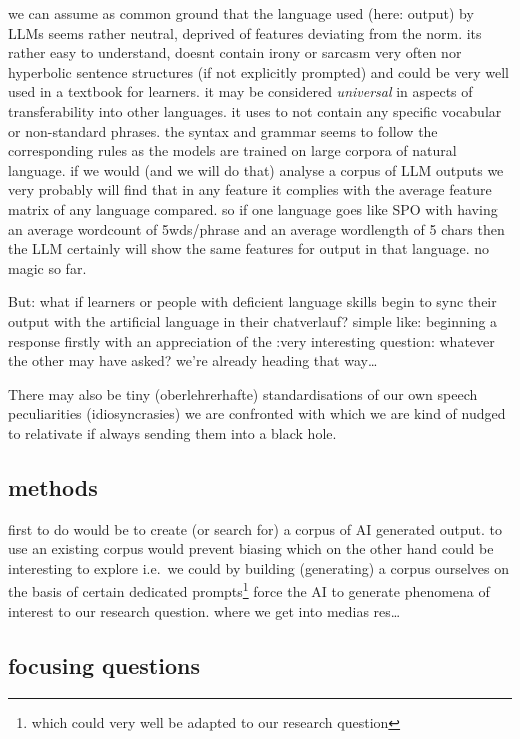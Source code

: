 \documentclass[
  letterpaper,
  DIV=11,
  numbers=noendperiod]{scrartcl}
\begin{document}
we can assume as common ground that the language used (here: output) by
LLMs seems rather neutral, deprived of features deviating from the norm.
its rather easy to understand, doesnt contain irony or sarcasm very
often nor hyperbolic sentence structures (if not explicitly prompted)
and could be very well used in a textbook for learners. it may be
considered \emph{universal} in aspects of transferability into other
languages. it uses to not contain any specific vocabular or non-standard
phrases. the syntax and grammar seems to follow the corresponding rules
as the models are trained on large corpora of natural language. if we
would (and we will do that) analyse a corpus of LLM outputs we very
probably will find that in any feature it complies with the average
feature matrix of any language compared. so if one language goes like
SPO with having an average wordcount of 5wds/phrase and an average
wordlength of 5 chars then the LLM certainly will show the same features
for output in that language. no magic so far.

But: what if learners or people with deficient language skills begin to
sync their output with the artificial language in their chatverlauf?
simple like: beginning a response firstly with an appreciation of the
:very interesting question: whatever the other may have asked? we're
already heading that way\ldots{}

There may also be tiny (oberlehrerhafte) standardisations of our own
speech peculiarities (idiosyncrasies) we are confronted with which we
are kind of nudged to relativate if always sending them into a black
hole.

\subsection{methods}\label{sec-methods}

first to do would be to create (or search for) a corpus of AI generated
output. to use an existing corpus would prevent biasing which on the
other hand could be interesting to explore i.e.~we could by building
(generating) a corpus ourselves on the basis of certain dedicated
prompts\footnote{which could very well be adapted to our research
  question} force the AI to generate phenomena of interest to our
research question. where we get into medias res\ldots{}

\subsection{focusing questions}\label{focusing-questions}
\end{document}

